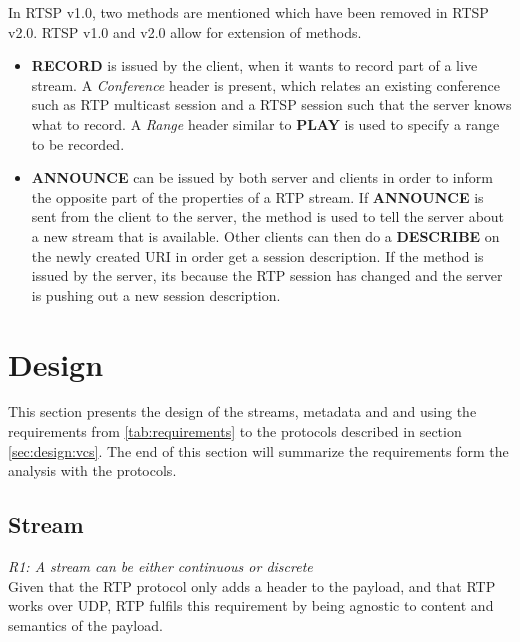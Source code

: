 In RTSP v1.0\citep{RFC2326}, two methods are mentioned which have been removed in RTSP v2.0. RTSP v1.0 and v2.0 allow for extension of methods.
\begin{itemize}
	\item \textbf{RECORD} is issued by the client, when it wants to record part of a live stream. A \textit{Conference} header is present, which relates an existing conference such as RTP multicast session and a RTSP session such that the server knows what to record. A \textit{Range} header similar to \textbf{PLAY} is used to specify a range to be recorded.
	\item \textbf{ANNOUNCE} can be issued by both server and clients in order to inform the opposite part of the properties of a RTP stream. If \textbf{ANNOUNCE} is sent from the client to the server, the method is used to tell the server about a new stream that is available. Other clients can then do a \textbf{DESCRIBE} on the newly created URI in order get a session description. If the method is issued by the server, its because the RTP session has changed and the server is pushing out a new session description.
\end{itemize}


\section{Design}
This section presents the design of the streams, metadata  and  and  using the requirements from \ref{tab:requirements} to the protocols described in section \ref{sec:design:vcs}. The end of this section will summarize the requirements form the analysis with the protocols.



\subsection{Stream}
\textit{R1: A stream can be either continuous or discrete} \\
Given that the RTP protocol only adds a header to the payload, and that RTP works over UDP, RTP fulfils this requirement by being agnostic to content and semantics of the payload. \\

